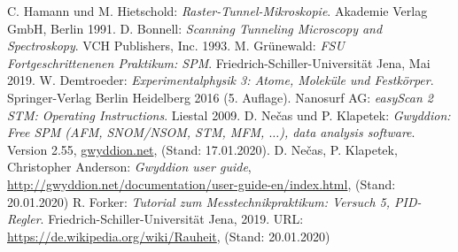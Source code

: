 \documentclass[a4paper,twoside,final]{article}
\begin{document}
\begin{thebibliography}{xxx}
C. Hamann und M. Hietschold: \textit{Raster-Tunnel-Mikroskopie}. Akademie Verlag GmbH, Berlin 1991.
D. Bonnell: \textit{Scanning Tunneling Microscopy and Spectroskopy}. VCH Publishers, Inc. 1993.
M. Grünewald: \textit{FSU Fortgeschrittenenen Praktikum: SPM}. Fried\-rich-Schil\-ler-Uni\-versi\-tät Jena, Mai 2019.
W. Demtroeder: \textit{Experimentalphysik 3: Atome, Moleküle und Festkörper}. Springer-Verlag Berlin Heidelberg 2016 (5. Auflage).
Nanosurf AG: \textit{easyScan 2 STM: Operating Instructions}. Liestal 2009.
D. Nečas und P. Klapetek: \textit{Gwyddion: Free SPM (AFM, SNOM/NSOM, STM, MFM, $\hdots$), data analysis software}. Version 2.55, \url{gwyddion.net}, (Stand: 17.01.2020).
D. Nečas, P. Klapetek, Christopher Anderson: \textit{Gwyddion user guide}, \url{http://gwyddion.net/documentation/user-guide-en/index.html}, (Stand: 20.01.2020)
R. Forker: \textit{Tutorial zum Messtechnikpraktikum: Versuch 5, PID-Regler}. Fried\-rich-Schil\-ler-Uni\-versi\-tät Jena, 2019.
URL: \url{https://de.wikipedia.org/wiki/Rauheit}, (Stand: 20.01.2020)
\end{thebibliography}
\end{document}
